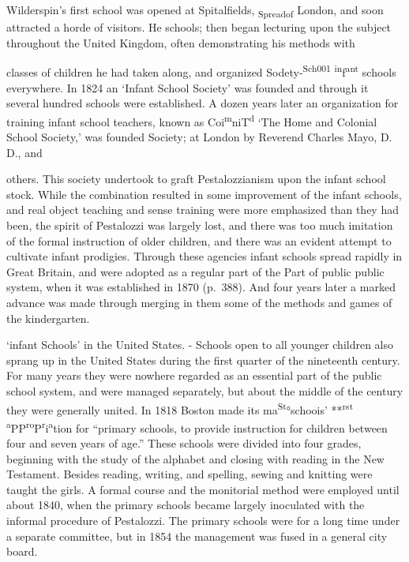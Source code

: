 \documentclass[]{book}
\begin{document}
Wilderspin's first school was opened at Spitalfields, \textsubscript{Spreadof} London, and soon attracted a horde of visitors. He schools; then began lecturing upon the subject throughout the United Kingdom, often demonstrating his methods with

classes of children he had taken along, and organized Sodety-\textsuperscript{Sch001} \textsuperscript{in}f\textsuperscript{ant} schools everywhere. In 1824 an `Infant School Society' was founded and through it several hundred schools were established. A dozen years later an organization for training infant school teachers, known as Coi\textsuperscript{m}niT\textsuperscript{d} `The Home and Colonial School Society,' was founded Society; at London by Reverend Charles Mayo, D. D., and

others. This society undertook to graft Pestalozzianism upon the infant school stock. While the combination resulted in some improvement of the infant schools, and real object teaching and sense training were more emphasized than they had been, the spirit of Pestalozzi was largely lost, and there was too much imitation of the formal instruction of older children, and there was an evident attempt to cultivate infant prodigies. Through these agencies infant schools spread rapidly in Great Britain, and were adopted as a regular part of the Part of public public system, when it was established in 1870 (p.~388). And four years later a marked advance was made through merging in them some of the methods and games of the kindergarten.

`infant Schools' in the United States. - Schools open to all younger children also sprang up in the United States during the first quarter of the nineteenth century. For many years they were nowhere regarded as an essential part of the public school system, and were managed separately, but about the middle of the century they were generally united. In 1818 Boston made its ma\textsuperscript{St}°schoois' **\textsuperscript{rst} \textsuperscript{a}PP\textsuperscript{ro}P\textsuperscript{r}i\textsuperscript{a}tion for ``primary schools, to provide instruction for children between four and seven years of age.'' These schools were divided into four grades, beginning with the study of the alphabet and closing\protect\hypertarget{ch20.xmlux5cux23para.308.1.0.box.122.232.1048.422.q.70}{}{ with reading in the New Testament. Besides reading, writing, and spelling, sewing and knitting were taught the girls. A formal course and the monitorial method were employed until about 1840, when the primary schools became largely inoculated with the informal procedure of Pestalozzi. The primary schools were for a long time under a separate committee, but in 1854 the management was fused in a general city board.}
\end{document}
